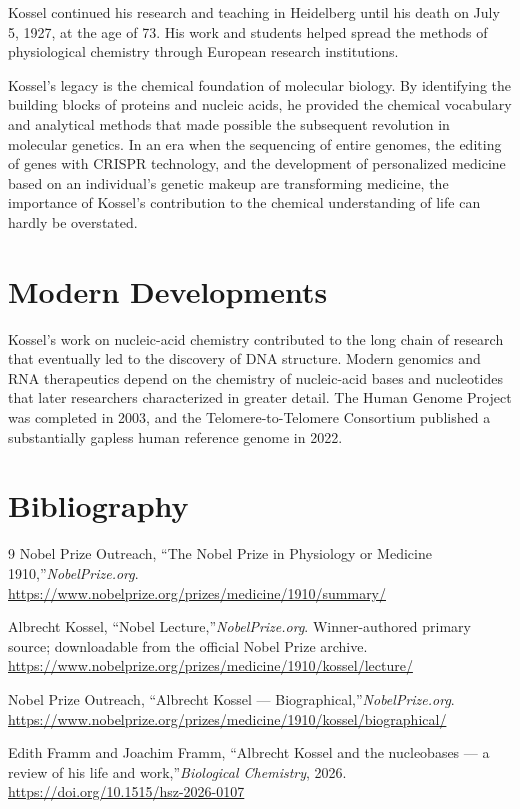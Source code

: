 Kossel continued his research and teaching in Heidelberg until his death on July 5, 1927, at the age of 73. His work and students helped spread the methods of physiological chemistry through European research institutions.\cite{kossel-biographical}

Kossel's legacy is the chemical foundation of molecular biology. By identifying the building blocks of proteins and nucleic acids, he provided the chemical vocabulary and analytical methods that made possible the subsequent revolution in molecular genetics. In an era when the sequencing of entire genomes, the editing of genes with CRISPR technology, and the development of personalized medicine based on an individual's genetic makeup are transforming medicine, the importance of Kossel's contribution to the chemical understanding of life can hardly be overstated.


\section{Modern Developments}

Kossel's work on nucleic-acid chemistry contributed to the long chain of research that eventually led to the discovery of DNA structure. Modern genomics and RNA therapeutics depend on the chemistry of nucleic-acid bases and nucleotides that later researchers characterized in greater detail. The Human Genome Project was completed in 2003, and the Telomere-to-Telomere Consortium published a substantially gapless human reference genome in 2022.\cite{kossel-history}


\section{Bibliography}

\begin{thebibliography}{9}
Nobel Prize Outreach, ``The Nobel Prize in Physiology or Medicine 1910,''\emph{NobelPrize.org}.\\
\url{https://www.nobelprize.org/prizes/medicine/1910/summary/}

Albrecht Kossel, ``Nobel Lecture,''\emph{NobelPrize.org}. Winner-authored primary source; downloadable from the official Nobel Prize archive.\\
\url{https://www.nobelprize.org/prizes/medicine/1910/kossel/lecture/}

Nobel Prize Outreach, ``Albrecht Kossel --- Biographical,''\emph{NobelPrize.org}.\\
\url{https://www.nobelprize.org/prizes/medicine/1910/kossel/biographical/}

Edith Framm and Joachim Framm, ``Albrecht Kossel and the nucleobases --- a review of his life and work,''\emph{Biological Chemistry}, 2026.\\
\url{https://doi.org/10.1515/hsz-2026-0107}
\end{thebibliography}
